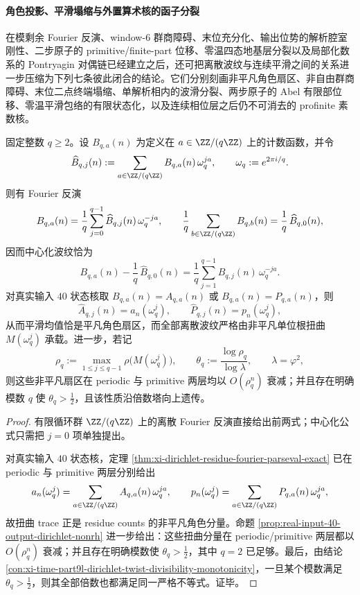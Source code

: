 \paragraph{角色投影、平滑塌缩与外置算术核的函子分裂}
在模剩余 Fourier 反演、window-\(6\) 群商障碍、末位充分化、输出位势的解析腔室刚性、二步原子的 primitive/finite-part 位移、零温四态地基层分裂以及局部化数系的 Pontryagin 对偶链已经建立之后，还可把离散波纹与连续平滑之间的关系进一步压缩为下列七条彼此闭合的结论。它们分别刻画非平凡角色扇区、非自由群商障碍、末位二点终端塌缩、单解析相内的波滑分裂、两步原子的 Abel 有限部位移、零温平滑包络的有限状态化，以及连续相位层之后仍不可消去的 profinite 素数核。

\begin{theorem}[角色投影的扭曲扇区分裂]\label{thm:xi-time-part67-character-projection-twisted-sectors}
固定整数 \(q\ge 2\)。设 \(B_{q,a}(n)\) 为定义在 \(a\in \ZZ/(q\ZZ)\) 上的计数函数，并令
\[
\widehat B_{q,j}(n):=\sum_{a\in \ZZ/(q\ZZ)}B_{q,a}(n)\,\omega_q^{ja},
\qquad
\omega_q:=e^{2\pi i/q}.
\]
则有 Fourier 反演
\[
B_{q,a}(n)=\frac1q\sum_{j=0}^{q-1}\widehat B_{q,j}(n)\,\omega_q^{-ja},
\qquad
\frac1q\sum_{b\in \ZZ/(q\ZZ)}B_{q,b}(n)=\frac1q\,\widehat B_{q,0}(n),
\]
因而中心化波纹恰为
\[
B_{q,a}(n)-\frac1q\,\widehat B_{q,0}(n)
=
\frac1q\sum_{j=1}^{q-1}\widehat B_{q,j}(n)\,\omega_q^{-ja}.
\]
对真实输入 \(40\) 状态核取 \(B_{q,a}(n)=A_{q,a}(n)\) 或 \(B_{q,a}(n)=P_{q,a}(n)\)，则
\[
\widehat A_{q,j}(n)=a_n(\omega_q^j),
\qquad
\widehat P_{q,j}(n)=p_n(\omega_q^j),
\]
从而平滑均值恰是平凡角色扇区，而全部离散波纹严格由非平凡单位根扭曲 \(M(\omega_q^j)\) 承载。进一步，若记
\[
\rho_q:=\max_{1\le j\le q-1}\rho\!\bigl(M(\omega_q^j)\bigr),
\qquad
\theta_q:=\frac{\log\rho_q}{\log\lambda},
\qquad
\lambda=\varphi^2,
\]
则这些非平凡扇区在 periodic 与 primitive 两层均以 \(O(\rho_q^n)\) 衰减；并且存在明确模数 \(q\) 使 \(\theta_q>\frac12\)，且该性质沿倍数塔向上遗传。
\end{theorem}
\begin{proof}
有限循环群 \(\ZZ/(q\ZZ)\) 上的离散 Fourier 反演直接给出前两式；中心化公式只需把 \(j=0\) 项单独提出。

对真实输入 \(40\) 状态核，定理 \ref{thm:xi-dirichlet-residue-fourier-parseval-exact} 已在 periodic 与 primitive 两层分别给出
\[
a_n(\omega_q^j)=\sum_{a\in \ZZ/(q\ZZ)}A_{q,a}(n)\,\omega_q^{ja},
\qquad
p_n(\omega_q^j)=\sum_{a\in \ZZ/(q\ZZ)}P_{q,a}(n)\,\omega_q^{ja},
\]
故扭曲 trace 正是 residue counts 的非平凡角色分量。命题 \ref{prop:real-input-40-output-dirichlet-nonrh} 进一步给出：这些扭曲分量在 periodic/primitive 两层都以 \(O(\rho_q^n)\) 衰减；并且存在明确模数使 \(\theta_q>\frac12\)，其中 \(q=2\) 已足够。最后，由结论 \ref{con:xi-time-part9l-dirichlet-twist-divisibility-monotonicity}，一旦某个模数满足 \(\theta_q>\frac12\)，则其全部倍数也都满足同一严格不等式。证毕。
\end{proof}

